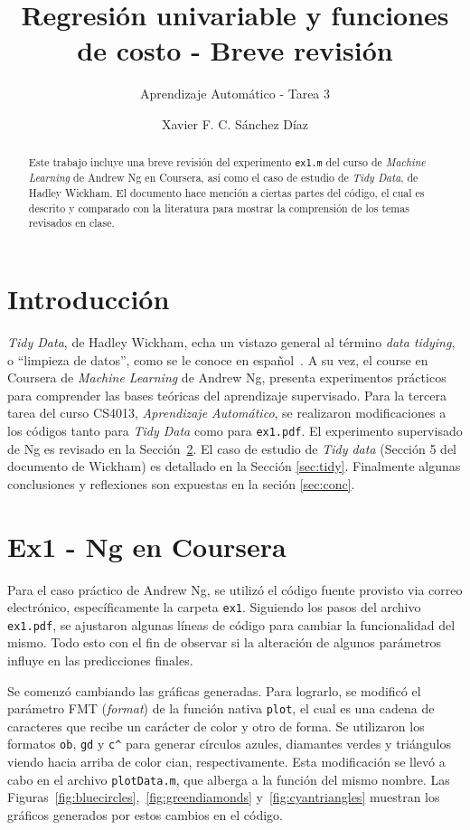 \documentclass{llncs}
\title{Regresión univariable y funciones de costo - Breve revisión}
\subtitle{Aprendizaje Automático - Tarea 3}
\author{Xavier F. C. Sánchez Díaz\inst{1}}
\institute{Tecnológico de Monterrey \\
\email{<mail@itesm.mx>}}
\begin{document}
\maketitle
\begin{abstract}
Este trabajo incluye una breve revisión del experimento \texttt{ex1.m} del curso de \textit{Machine Learning} de Andrew Ng en Coursera, así como el caso de estudio de \textit{Tidy Data}, de Hadley Wickham.
El documento hace mención a ciertas partes del código, el cual es descrito y comparado con la literatura para mostrar la comprensión de los temas revisados en clase.
\end{abstract}

\section{Introducción}
\label{sec:intro}

\textit{Tidy Data}, de Hadley Wickham, echa un vistazo general al término \textit{data tidying}, o ``limpieza de datos'', como se le conoce en español~\cite{JSSv059i10}.
A su vez,
el course en Coursera de \textit{Machine Learning} de Andrew Ng,
presenta experimentos prácticos para comprender las bases teóricas del aprendizaje supervisado.
Para la tercera tarea del curso CS4013, \textit{Aprendizaje Automático}, se realizaron modificaciones a los códigos tanto para \textit{Tidy Data} como para \texttt{ex1.pdf}.
El experimento supervisado de Ng es revisado en la Sección~\ref{sec:ex1}.
El caso de estudio de \textit{Tidy data} (Sección 5 del documento de Wickham) es detallado en la Sección \ref{sec:tidy}.
Finalmente algunas conclusiones y reflexiones son expuestas en la seción \ref{sec:conc}.

\section{Ex1 - Ng en Coursera} %
\label{sec:ex1}

Para el caso práctico de Andrew Ng, se utilizó el código fuente provisto via correo electrónico, específicamente la carpeta \texttt{ex1}.
Siguiendo los pasos del archivo \texttt{ex1.pdf},
se ajustaron algunas líneas de código para cambiar la funcionalidad del mismo.
Todo esto con el fin de observar si la alteración de algunos parámetros influye en las predicciones finales.

Se comenzó cambiando las gráficas generadas.
Para lograrlo, se modificó el parámetro FMT (\textit{format}) de la función nativa \texttt{plot},
el cual es una cadena de caracteres que recibe un carácter de color y otro de forma.
Se utilizaron los formatos \texttt{ob}, \texttt{gd} y \texttt{c\^} para generar círculos azules, diamantes verdes y triángulos viendo hacia arriba de color cian, respectivamente.
Esta modificación se llevó a cabo en el archivo \texttt{plotData.m}, que alberga a la función del mismo nombre.
Las Figuras~\ref{fig:bluecircles},~\ref{fig:greendiamonds} y~\ref{fig:cyantriangles} muestran los gráficos generados por estos cambios en el código.
\end{document}
